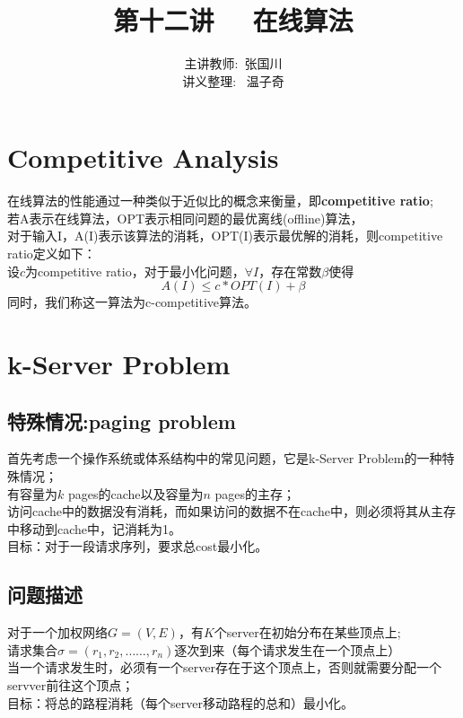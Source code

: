 \documentclass[11pt]{ctexart}
\title{\Huge 第十二讲  \ \ 在线算法}
\author{主讲教师:\  张国川
\\ 讲义整理: \ 温子奇}
\begin{document}
\maketitle




\section{Competitive Analysis}

在线算法的性能通过一种类似于近似比的概念来衡量，即\textbf{competitive ratio};\\

若A表示在线算法，OPT表示相同问题的最优离线(offline)算法，\\
对于输入I，A(I)表示该算法的消耗，OPT(I)表示最优解的消耗，则competitive ratio定义如下：\\
设$c$为competitive ratio，对于最小化问题，$\forall I$，存在常数$\beta$使得\\
$$A(I) \leq c*OPT(I)+\beta$$
同时，我们称这一算法为c-competitive算法。

\section{ k-Server Problem}

\subsection{特殊情况:paging problem}
首先考虑一个操作系统或体系结构中的常见问题，它是k-Server Problem的一种特殊情况；\\

有容量为$k$ pages的cache以及容量为$n$ pages的主存；\\

访问cache中的数据没有消耗，而如果访问的数据不在cache中，则必须将其从主存中移动到cache中，记消耗为1。\\

目标：对于一段请求序列，要求总cost最小化。\\

\subsection{问题描述}
对于一个加权网络$G=(V,E)$，有$K$个server在初始分布在某些顶点上;\\
请求集合$\sigma=(r_1,r_2,……,r_n)$逐次到来（每个请求发生在一个顶点上）\\
当一个请求发生时，必须有一个server存在于这个顶点上，否则就需要分配一个servver前往这个顶点；\\
目标：将总的路程消耗（每个server移动路程的总和）最小化。\\
\end{document}
